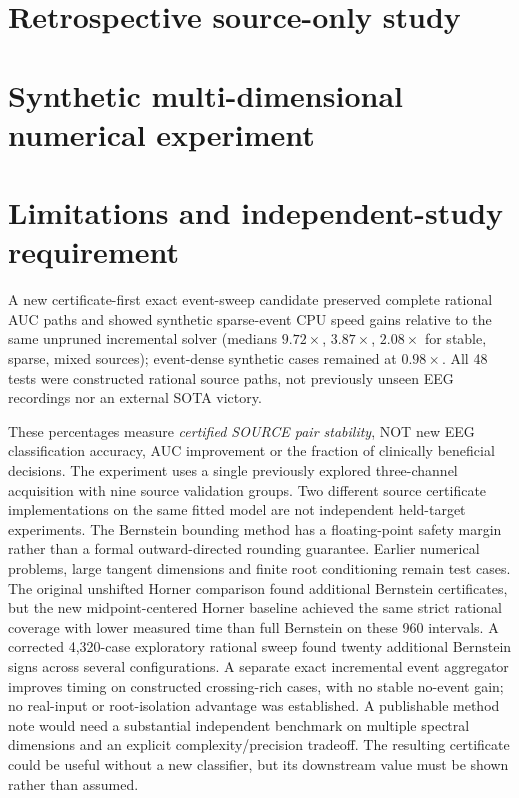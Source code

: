\documentclass[11pt,a4paper]{article}
\begin{document}
\section{Retrospective source-only study}


\section{Synthetic multi-dimensional numerical experiment}










\section{Limitations and independent-study requirement}
A new certificate-first exact event-sweep candidate preserved complete
rational AUC paths and showed synthetic sparse-event CPU speed gains
relative to the same unpruned incremental solver (medians
$9.72\times$, $3.87\times$, $2.08\times$ for stable, sparse,
mixed sources); event-dense synthetic cases remained at
$0.98\times$. All 48 tests were constructed rational source paths,
not previously unseen EEG recordings nor an external SOTA victory.

These percentages measure \emph{certified
SOURCE pair stability}, NOT new EEG
classification accuracy, AUC improvement
or the fraction of clinically
beneficial decisions. The experiment
uses a single previously explored
three-channel acquisition with nine
source validation groups. Two
different source certificate implementations
on the same fitted model are not
independent held-target experiments.
The Bernstein bounding method has
a floating-point safety margin rather
than a formal outward-directed rounding
guarantee. Earlier numerical problems,
large tangent dimensions and finite
root conditioning remain test cases.
The original unshifted Horner comparison found
additional Bernstein certificates, but the new
midpoint-centered Horner baseline achieved the
same strict rational coverage with lower measured
time than full Bernstein on these 960 intervals.
A corrected 4,320-case exploratory rational sweep found
twenty additional Bernstein signs across several configurations.
A separate exact incremental event aggregator improves timing
on constructed crossing-rich cases, with no stable no-event gain;
no real-input or root-isolation advantage was established.
A publishable method note would
need a substantial independent benchmark
on multiple spectral dimensions and
an explicit complexity/precision tradeoff.
The resulting certificate could be useful
without a new classifier, but its
downstream value must be shown rather
than assumed.
\end{document}
